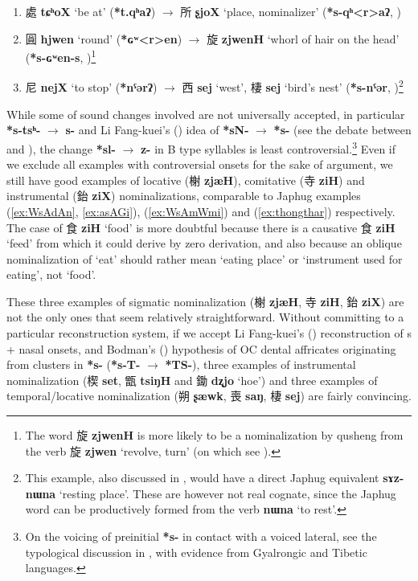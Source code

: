 \documentclass[oneside,a4paper,11pt]{article}
\newcommand{\ipa}[1]{\textbf{{\phon\mbox{#1}}}} %
\newcommand{\zh}[1]{{\cn #1}}
\newcommand{\zhc}[2]{\zh{#1} \ipa{#2}}
\begin{document}
\begin{enumerate}
\item \zhc{處}{tɕʰoX} ‘be at’ (\ipa{*t.qʰaʔ}) $\rightarrow$ \zhc{所}{ʂjoX} ‘place, nominalizer’ (\ipa{*s-qʰ<r>aʔ}, \citealt[130]{bs14oc})
\item \zhc{圓}{hjwen} ‘round’ (\ipa{*ɢʷ<r>en}) $\rightarrow$ \zhc{旋}{zjwenH} ‘whorl of hair on the head’ (\ipa{*s-ɢʷen-s}, \citealt[141]{bs14oc})\footnote{The word \zhc{旋}{zjwenH} is more likely to be a nominalization by qusheng from the verb \zhc{旋}{zjwen} `revolve, turn' (on which see \citealt{downer59, jacques16ssuffixes}). }
\item \zhc{尼}{nejX} ‘to stop’ (\ipa{*nˤərʔ}) $\rightarrow$ \zhc{西}{sej} ‘west’, \zhc{棲}{sej} ‘bird’s nest’  (\ipa{*s-nˤər}, \citealt[147]{bs14oc})\footnote{This example, also discussed in \citet{sagart04directions}, would have a direct Japhug equivalent \ipa{sɤz-nɯna} `resting place'. These are however not real cognate, since the Japhug word can be productively formed from the verb  \ipa{nɯna} `to rest'.}
\end{enumerate}
 
  
While some of sound changes involved are not universally accepted, in particular \ipa{*s-tsʰ-} $\rightarrow$ \ipa{s-} and Li Fang-kuei's (\citealt{lifk71shanggu}) idea of \ipa{*sN-} $\rightarrow$ \ipa{*s-} (see the debate between  \citealt{mei12caus} and \citealt{sagart12sprefix}), the change \ipa{*sl-} $\rightarrow$ \ipa{z-} in B type syllables is least controversial.\footnote{On the voicing of preinitial \ipa{*s-} in contact with a voiced lateral, see the typological discussion in \citet{gong16ld}, with evidence from Gyalrongic and Tibetic languages.} Even if we exclude all examples with controversial onsets for the sake of argument, we still have good examples of locative (\zhc{榭}{zjæH}), comitative (\zhc{寺}{ziH}) and instrumental (\zhc{鈶}{ziX}) nominalizations, comparable to Japhug examples (\ref{ex:WsAdAn}, \ref{ex:asAGi}), (\ref{ex:WsAmWmi}) and (\ref{ex:thongthar}) respectively. The case of \zhc{食}{ziH} `food' is more doubtful because there is a causative \zhc{食}{ziH} `feed' from which it could derive by zero derivation, and also because an oblique nominalization of `eat' should rather mean `eating place' or `instrument used for eating', not `food'.

These three examples of sigmatic nominalization  (\zhc{榭}{zjæH}, \zhc{寺}{ziH},  \zhc{鈶}{ziX}) are not the only ones that seem relatively straightforward. Without committing to a particular reconstruction system, if we accept Li Fang-kuei's (\citealt{lifk71shanggu}) reconstruction of s + nasal onsets, and Bodman's (\citeyear{bodman69sdud}) hypothesis of OC dental affricates originating from clusters in \ipa{*s-} (\ipa{*s-T-} $\rightarrow$ \ipa{*TS-}), three examples of instrumental nominalization (\zhc{楔}{set},   \zhc{甑}{tsiŋH} and \zhc{鋤}{dʐjo} ‘hoe’) and three examples of temporal/locative nominalization (\zhc{朔}{ʂæwk}, \zhc{喪}{saŋ}, \zhc{棲}{sej}) are fairly convincing.
\end{document}
